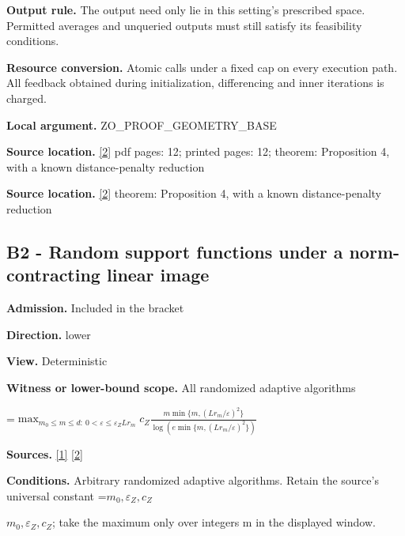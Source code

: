 \documentclass[10pt,a4paper]{article}
\newcommand{\AtlasMath}[1]{\par\begingroup\centering\setbox0=\hbox{$\displaystyle #1$}\ifdim\wd0>1.4\linewidth\typeout{ATLAS WIDE FORMULA: \the\wd0}\fi\ifdim\wd0>\linewidth\resizebox{\linewidth}{!}{\box0}\else\box0\fi\par\endgroup}
\newcommand{\AtlasInlineMath}[1]{\begingroup\setbox0=\hbox{$#1$}\ifdim\wd0>.4\linewidth\endgroup\AtlasMath{#1}\else\endgroup$#1$\fi}
\begin{document}
\textbf{Output rule.} The output need only lie in this setting's prescribed space. Permitted averages and unqueried outputs must still satisfy its feasibility conditions.



\textbf{Resource conversion.} Atomic calls under a fixed cap on every execution path. All feedback obtained during initialization, differencing and inner iterations is charged.



\textbf{Local argument.} ZO\_PROOF\_GEOMETRY\_BASE



\textbf{Source location.} \href{https://arxiv.org/html/2607.16558v2}{[2]} pdf pages: 12; printed pages: 12; theorem: Proposition 4, with a known distance-penalty reduction



\textbf{Source location.} \href{https://arxiv.org/html/2607.16558v2}{[2]} theorem: Proposition 4, with a known distance-penalty reduction



\subsection{B2 - Random support functions under a norm-contracting linear image}


\textbf{Admission.} Included in the bracket



\textbf{Direction.} lower



\textbf{View.} Deterministic



\textbf{Witness or lower-bound scope.} All randomized adaptive algorithms



\AtlasMath{\max_{m_0\le m\le d:\ 0<\varepsilon\le\varepsilon_Z Lr_m}c_Z\frac{m\min\{m,(Lr_m/\varepsilon)^2\}}{\log(e\min\{m,(Lr_m/\varepsilon)^2\})}}


\textbf{Sources.} \href{https://arxiv.org/html/2610.00345v1}{[1]} \href{https://arxiv.org/html/2607.16558v2}{[2]}



\textbf{Conditions.} Arbitrary randomized adaptive algorithms. Retain the source's universal constant \AtlasInlineMath{m_0,\varepsilon_Z,c_Z}; take the maximum only over integers m in the displayed window.
\end{document}
